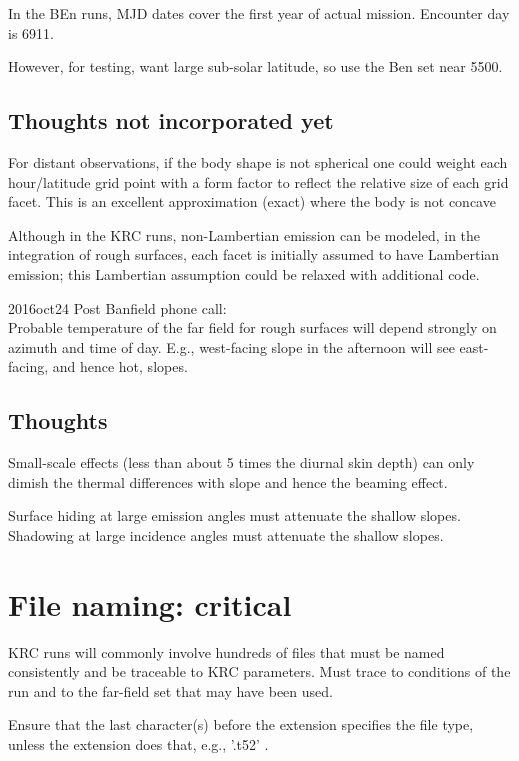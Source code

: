 \documentclass{article}
\begin{document}
In the BEn runs, MJD dates cover the first year of actual mission. Encounter day is 6911.

However, for testing, want large sub-solar latitude,   so use the Ben set near 5500.


\subsection{Thoughts not incorporated yet}

For distant observations, if the body shape is not spherical one could weight
each hour/latitude grid point with a form factor to reflect the relative size of
each grid facet. This is an excellent approximation (exact) where the body is
not concave

Although in the KRC runs, non-Lambertian emission can be modeled, in the
integration of rough surfaces, each facet is initially assumed to have
Lambertian emission; this Lambertian assumption could be relaxed with additional
code.
 
2016oct24 Post Banfield phone call: 
\\ Probable temperature of the far field for rough surfaces will depend strongly
on azimuth and time of day. E.g., west-facing slope in the afternoon will see
east-facing, and hence hot, slopes.
 

\subsection{Thoughts}

 Small-scale effects (less than about 5 times the diurnal skin depth) can only
 dimish the thermal differences with slope and hence the beaming effect.

Surface hiding at large emission angles must attenuate the shallow slopes. 
Shadowing at large incidence angles must attenuate the shallow slopes.


\section{File naming: critical}

 KRC runs will commonly involve hundreds of files that must be named
 consistently and be traceable to KRC parameters.  Must trace to conditions of
 the run and to the far-field set that may have been used. 

Ensure that the last character(s) before the extension specifies the file type,
 unless the extension does that, e.g., '.t52' .
\end{document}

